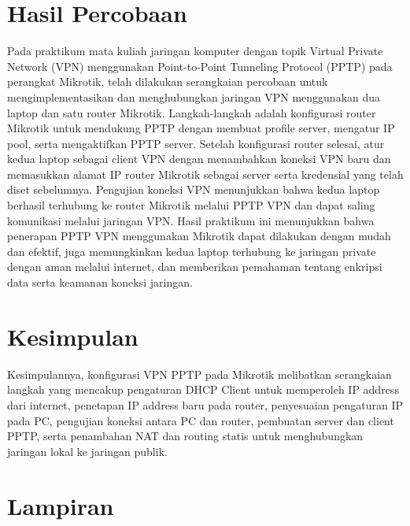 \section{Hasil Percobaan}
\indent Pada praktikum mata kuliah jaringan komputer dengan topik Virtual Private Network (VPN) 
menggunakan Point-to-Point Tunneling Protocol (PPTP) pada perangkat Mikrotik, telah dilakukan 
serangkaian percobaan untuk mengimplementasikan dan menghubungkan jaringan VPN menggunakan dua laptop 
dan satu router Mikrotik. Langkah-langkah adalah konfigurasi router Mikrotik untuk mendukung PPTP dengan 
membuat profile server, mengatur IP pool, serta mengaktifkan PPTP server. Setelah konfigurasi router selesai, 
atur kedua laptop sebagai client VPN dengan menambahkan koneksi VPN baru dan memasukkan alamat IP router Mikrotik 
sebagai server serta kredensial yang telah diset sebelumnya. Pengujian koneksi VPN menunjukkan bahwa kedua laptop berhasil terhubung 
ke router Mikrotik melalui PPTP VPN dan dapat saling komunikasi melalui jaringan VPN. Hasil praktikum ini menunjukkan bahwa penerapan
PPTP VPN menggunakan Mikrotik dapat dilakukan dengan mudah dan efektif, juga memungkinkan kedua laptop terhubung ke jaringan private 
dengan aman melalui internet, dan memberikan pemahaman tentang enkripsi data serta keamanan koneksi jaringan.

\section{Kesimpulan}
\indent Kesimpulannya, konfigurasi VPN PPTP pada Mikrotik melibatkan serangkaian langkah yang mencakup pengaturan 
DHCP Client untuk memperoleh IP address dari internet, penetapan IP address baru pada router, penyesuaian pengaturan 
IP pada PC, pengujian koneksi antara PC dan router, pembuatan server dan client PPTP, serta penambahan NAT dan routing 
statis untuk menghubungkan jaringan lokal ke jaringan publik.

\section{Lampiran}

